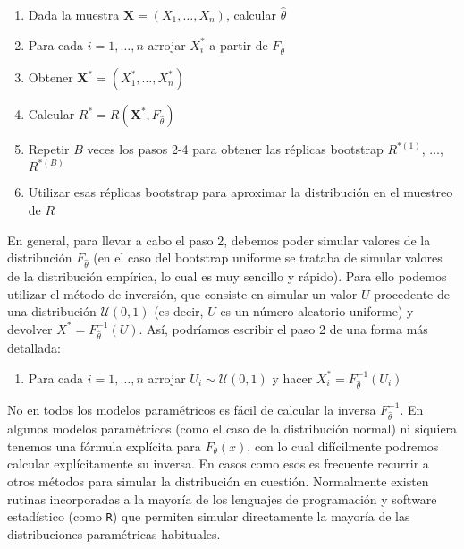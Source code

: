 \documentclass[
]{book}
\providecommand{\tightlist}{%
  \setlength{\itemsep}{0pt}\setlength{\parskip}{0pt}}
\theoremstyle{break}
\theoremstyle{definition}
\theoremstyle{definition}
\theoremstyle{definition}
\theoremstyle{definition}
\theoremstyle{remark}
\begin{document}
\begin{enumerate}
\def\labelenumi{\arabic{enumi}.}
\item
  Dada la muestra
  \(\mathbf{X}=\left( X_1,\ldots ,X_n \right)\), calcular
  \(\hat{\theta}\)
\item
  Para cada \(i=1,\ldots ,n\) arrojar \(X_i^{\ast}\) a partir de
  \(F_{\hat{\theta}}\)
\item
  Obtener \(\mathbf{X}^{\ast}=\left( X_1^{\ast},\ldots ,X_n^{\ast} \right)\)
\item
  Calcular
  \(R^{\ast}=R\left( \mathbf{X}^{\ast},F_{\hat{\theta} } \right)\)
\item
  Repetir \(B\) veces los pasos 2-4 para obtener las réplicas bootstrap
  \(R^{\ast (1)}\), \(\ldots\), \(R^{\ast (B)}\)
\item
  Utilizar esas réplicas bootstrap para aproximar la distribución en el
  muestreo de \(R\)
\end{enumerate}

En general, para llevar a cabo el paso 2, debemos poder simular valores
de la distribución \(F_{\hat{\theta}}\) (en el caso del bootstrap uniforme
se trataba de simular valores de la distribución empírica, lo cual es
muy sencillo y rápido). Para ello podemos utilizar el método de
inversión, que consiste en simular un valor \(U\) procedente de una
distribución \(\mathcal{U}\left( 0,1 \right)\) (es decir, \(U\) es un número aleatorio
uniforme) y devolver \(X^{\ast}=F_{\hat{\theta}}^{-1}\left( U \right)\). Así, podríamos escribir el paso 2 de una forma más
detallada:

\begin{enumerate}
\def\labelenumi{\arabic{enumi}.}
\setcounter{enumi}{1}
\tightlist
\item
  Para cada \(i=1,\ldots ,n\) arrojar \(U_i\sim \mathcal{U}\left( 0,1 \right)\) y
  hacer \(X_i^{\ast}=F_{\hat{\theta}}^{-1}\left( U_i \right)\)
\end{enumerate}

No en todos los modelos paramétricos es fácil de calcular la inversa
\(F_{\hat{\theta}}^{-1}\). En algunos modelos paramétricos (como el caso
de la distribución normal) ni siquiera tenemos una fórmula explícita
para \(F_{\theta }\left( x \right)\), con lo cual difícilmente podremos
calcular explícitamente su inversa. En casos como esos es frecuente
recurrir a otros métodos para simular la distribución en cuestión.
Normalmente existen rutinas incorporadas a la mayoría de los lenguajes
de programación y software estadístico (como \texttt{R}) que permiten simular
directamente la mayoría de las distribuciones paramétricas habituales.
\end{document}
